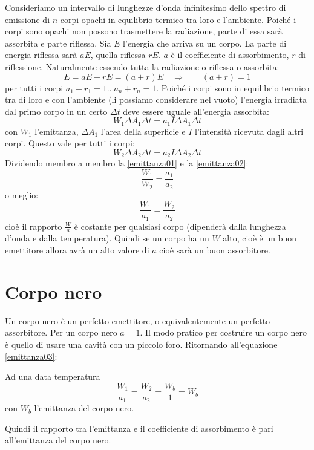 Consideriamo un intervallo di lunghezze d'onda infinitesimo dello spettro di emissione di $n$ corpi opachi in equilibrio termico tra loro e l'ambiente. Poiché i corpi sono opachi non possono trasmettere la radiazione, parte di essa sarà assorbita e parte riflessa. Sia $E$ l'energia che arriva su un corpo. La parte di energia riflessa sarà $aE$, quella riflessa $rE$. $a$ è il coefficiente di assorbimento, $r$ di riflessione. Naturalmente essendo tutta la radiazione o riflessa o assorbita:
\begin{equation}
E=aE+rE=(a+r)E\quad\Rightarrow \qquad(a+r)=1
\end{equation}
per tutti i corpi $a_1+r_1=1\ldots a_n+r_n=1$. Poiché i corpi sono in equilibrio termico tra di loro e con l'ambiente (li possiamo considerare nel vuoto) l'energia irradiata dal primo corpo in un certo $\Delta t$ deve essere uguale all'energia assorbita:
\begin{equation}
W_1\Delta A_1\Delta t=a_1I\Delta A_1\Delta t
\label{emittanza01}
\end{equation}
con $W_1$ l'emittanza, $\Delta A_1$ l'area della superficie e $I$ l'intensità ricevuta dagli altri corpi. Questo vale per tutti i corpi:
\begin{equation}
W_2\Delta A_2\Delta t=a_2I\Delta A_2\Delta t
\label{emittanza02}
\end{equation}
Dividendo membro a membro la \eqref{emittanza01} e la \eqref{emittanza02}:
\begin{equation}
\frac{W_1}{W_2}=\frac{a_1}{a_2}
\end{equation}
o meglio:
\begin{equation}
\frac{W_1}{a_1}=\frac{W_2}{a_2}
\label{emittanza03}
\end{equation}
cioè il rapporto $\frac{W}{a}$ è costante per qualsiasi corpo (dipenderà dalla lunghezza d'onda e dalla temperatura). Quindi se un corpo ha un $W$ alto, cioè è un buon emettitore allora avrà un alto valore di $a$ cioè sarà un buon assorbitore.
\section{Corpo nero}
Un corpo nero è un perfetto emettitore, o equivalentemente un perfetto assorbitore. Per un corpo nero $a=1$. Il modo pratico per costruire un corpo nero è quello di usare una cavità con un piccolo foro. Ritornando all'equazione \eqref{emittanza03}:
\begin{legge}
Ad una data temperatura
\begin{equation}
\frac{W_1}{a_1}=\frac{W_2}{a_2}=\frac{W_b}{1}=W_b
\end{equation}
con $W_b$ l'emittanza del corpo nero.
\end{legge}
Quindi il rapporto tra l'emittanza e il coefficiente di assorbimento è pari all'emittanza del corpo nero.
